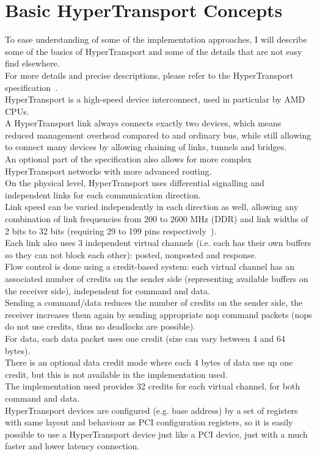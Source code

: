 \chapter{Basic HyperTransport Concepts}

To ease understanding of some of the implementation approaches, I will describe
some of the basics of HyperTransport and some of the details that are not easy
find elsewhere.\\
For more details and precise descriptions, please refer to the HyperTransport
specification~\cite{htspec}.\\
HyperTransport is a high-speed device interconnect, used in particular by AMD
CPUs.\\
A HyperTransport link always connects exactly two devices, which means reduced
management overhead compared to and ordinary bus, while still allowing to
connect many devices by allowing chaining of links, tunnels and bridges.\\
An optional part of the specification also allows for more complex
HyperTransport networks with more advanced routing.\\
On the physical level, HyperTransport uses differential signalling and
independent links for each communication direction.\\
Link speed can be varied independently in each direction as well, allowing
any combination of link frequencies from 200 to 2600 MHz (DDR) and link widths
of 2 bits to 32 bits (requiring 29 to 199 pins respectively~\cite{htarch}).\\
Each link also uses 3 independent virtual channels (i.e. each has their own
buffers so they can not block each other): posted, nonposted and response.\\
Flow control is done using a credit-based system: each virtual channel has an
associated number of credits on the sender side (representing available buffers
on the receiver side), independent for command and data.\\
Sending a command/data reduces the number of credits on the sender side,
the receiver increases them again by sending appropriate nop command packets
(nops do not use credits, thus no deadlocks are possible).\\
For data, each data packet uses one credit (size can vary between 4 and 64
bytes).\\
There is an optional data credit mode where each 4 bytes of data use up one
credit, but this is not available in the implementation used.\\
The implementation used provides 32 credits for each virtual channel, for both
command and data.\\
HyperTransport devices are configured (e.g. base address) by a set of registers
with same layout and behaviour as PCI configuration registers, so it is easily
possible to use a HyperTransport device just like a PCI device, just with a much
faster and lower latency connection.\\
